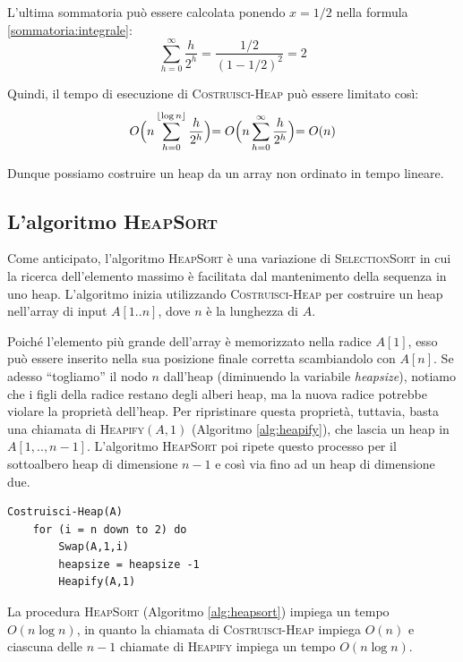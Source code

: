 L'ultima sommatoria può essere calcolata ponendo $x=1/2$ nella formula \ref{sommatoria:integrale}:
\begin{displaymath}
	\sum_{h=0}^{\infty} \frac{h}{2^{h}} = \frac{1/2}{(1-1/2)^{2}}=2
\end{displaymath}

Quindi, il tempo di esecuzione di \textsc{Costruisci-Heap} può essere limitato così:
\begin{equation}
	O\Bigl(n \sum_{h=0}^{\lfloor \log n \rfloor} \frac{h}{2^{h}} \Bigl) = O\Bigl(n \sum_{h=0}^{\infty} \frac{h}{2^{h}}\Bigl)=O(n)
\end{equation}

Dunque possiamo costruire un heap da un array non ordinato in tempo lineare.

\subsection{L'algoritmo \textsc{HeapSort}}
Come anticipato, l'algoritmo \textsc{HeapSort} è una variazione di \textsc{SelectionSort} in cui la ricerca dell'elemento massimo è facilitata dal mantenimento della sequenza in uno heap.
L'algoritmo inizia utilizzando \textsc{Costruisci-Heap} per costruire un heap nell'array di input $A[1..n]$, dove $n$ è la lunghezza di $A$.

Poiché l'elemento più grande dell'array è memorizzato nella radice $A[1]$, esso può essere inserito nella sua posizione finale corretta scambiandolo con $A[n]$. Se adesso ``togliamo'' il nodo $n$ dall'heap (diminuendo la variabile \textit{heapsize}), notiamo che i figli della radice restano degli alberi heap, ma la nuova radice potrebbe violare la proprietà dell'heap. Per ripristinare questa proprietà, tuttavia, basta una chiamata di \textsc{Heapify}$(A,1)$ (Algoritmo \ref{alg:heapify}), che lascia un heap in $A[1,..,n-1]$. L'algoritmo \textsc{HeapSort} poi ripete questo processo per il sottoalbero heap di dimensione $n-1$ e così via fino ad un heap di dimensione due.

\begin{lstlisting}[caption={\textsc{HeapSort}(A)},label=alg:heapsort,language=asd]
	Costruisci-Heap(A)
	for (i = n down to 2) do
		Swap(A,1,i)
		heapsize = heapsize -1
		Heapify(A,1)
\end{lstlisting}

La procedura \textsc{HeapSort} (Algoritmo \ref{alg:heapsort}) impiega un tempo $O(n \log n)$, in quanto la chiamata di \textsc{Costruisci-Heap} impiega $O(n)$ e ciascuna delle $n-1$ chiamate di \textsc{Heapify} impiega un tempo $O(n \log n)$.

